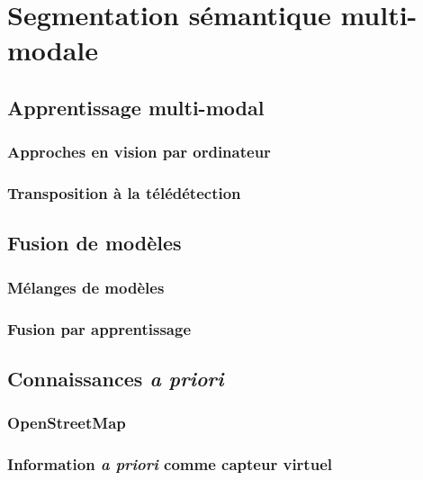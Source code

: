 \chapter{Segmentation sémantique multi-modale}

\section{Apprentissage multi-modal}

\subsection{Approches en vision par ordinateur}

\subsection{Transposition à la télédétection}

\section{Fusion de modèles}

\subsection{Mélanges de modèles}

\subsection{Fusion par apprentissage}

\section{Connaissances \textit{a priori}}

\subsection{OpenStreetMap}

\subsection{Information \textit{a priori} comme capteur virtuel}
